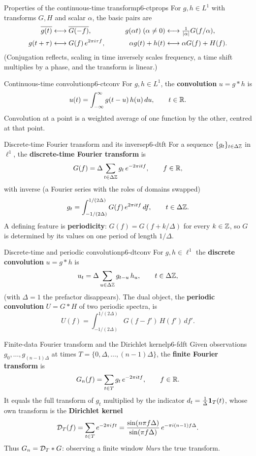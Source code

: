 \begin{definition}{Properties of the continuous-time transform}{p6-ctprops}
For $g,h\in L^1$ with transforms $G,H$ and scalar $\alpha$, the basic pairs are
\[
\begin{aligned}
\overline{g(t)} &\longleftrightarrow \overline{G(-f)}, &\qquad
g(\alpha t)\;(\alpha\ne0) &\longleftrightarrow \tfrac{1}{\left\lvert \alpha \right\rvert}G(f/\alpha),\\
g(t+\tau) &\longleftrightarrow G(f)\,e^{2\pi i \tau f}, &\qquad
\alpha g(t)+h(t) &\longleftrightarrow \alpha G(f)+H(f).
\end{aligned}
\]
(Conjugation reflects, scaling in time inversely scales frequency, a time
shift multiplies by a phase, and the transform is linear.)
\end{definition}

\begin{definition}{Continuous-time convolution}{p6-ctconv}
For $g,h\in L^1$, the \textbf{convolution} $u=g*h$ is
\[
u(t)=\int_{-\infty}^{\infty} g(t-u)\,h(u)\,du,\qquad t\in\mathbb{R} .
\]
Convolution at a point is a weighted average of one function by the other,
centred at that point.
\end{definition}

\begin{definition}{Discrete-time Fourier transform and its inverse}{p6-dtft}
For a sequence $\{g_t\}_{t\in\Delta\mathbb{Z}}$ in $\ell^1$, the
\textbf{discrete-time Fourier transform} is
\[
G(f)=\Delta\sum_{t\in\Delta\mathbb{Z}} g_t\,e^{-2\pi i t f},\qquad f\in\mathbb{R},
\]
with inverse (a Fourier series with the roles of domains swapped)
\[
g_t=\int_{-1/(2\Delta)}^{1/(2\Delta)} G(f)\,e^{2\pi i t f}\,df,\qquad t\in\Delta\mathbb{Z} .
\]
A defining feature is \textbf{periodicity}: $G(f)=G(f+k/\Delta)$ for every
$k\in\mathbb{Z}$, so $G$ is determined by its values on one period of length
$1/\Delta$.
\end{definition}

\begin{definition}{Discrete-time and periodic convolution}{p6-dtconv}
For $g,h\in\ell^1$ the \textbf{discrete convolution} $u=g*h$ is
\[
u_t=\Delta\sum_{u\in\Delta\mathbb{Z}} g_{t-u}\,h_u,\qquad t\in\Delta\mathbb{Z},
\]
(with $\Delta=1$ the prefactor disappears). The dual object, the
\textbf{periodic convolution} $U=G*H$ of two periodic spectra, is
\[
U(f)=\int_{-1/(2\Delta)}^{1/(2\Delta)} G(f-f')\,H(f')\,df' .
\]
\end{definition}

\begin{definition}{Finite-data Fourier transform and the Dirichlet kernel}{p6-fdft}
Given observations $g_0,\dots,g_{(n-1)\Delta}$ at times
$T=\{0,\Delta,\dots,(n-1)\Delta\}$, the \textbf{finite Fourier transform} is
\[
G_n(f)=\sum_{t\in T} g_t\,e^{-2\pi i t f},\qquad f\in\mathbb{R} .
\]
It equals the full transform of $g_t$ multiplied by the indicator
$d_t=\tfrac1\Delta\mathbf{1}_T(t)$, whose own transform is the \textbf{Dirichlet
kernel}
\[
\mathcal{D}_T(f)=\sum_{t\in T} e^{-2\pi i f t}
=\frac{\sin(n\pi f\Delta)}{\sin(\pi f\Delta)}\,e^{-\pi i (n-1) f\Delta}.
\]
Thus $G_n=\mathcal{D}_T * G$: observing a finite window \emph{blurs} the true
transform.
\end{definition}

